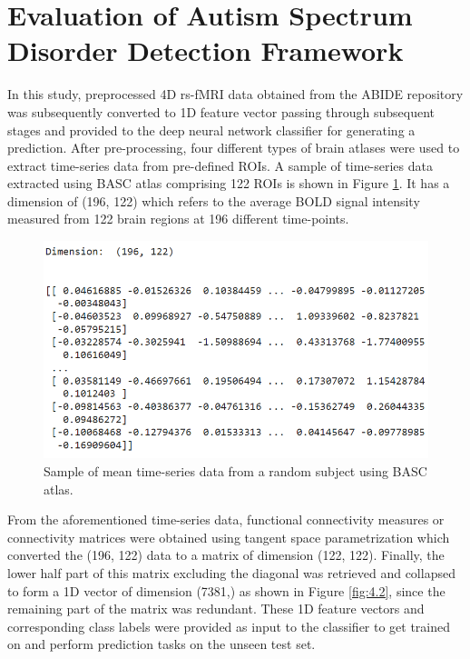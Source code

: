 \section{Evaluation of Autism Spectrum Disorder Detection Framework}

In this study, preprocessed 4D rs-fMRI data obtained from the ABIDE repository was subsequently converted to 1D feature vector passing through subsequent stages and provided to the deep neural network classifier for generating a prediction. After pre-processing, four different types of brain atlases
were used to extract time-series data from pre-defined ROIs. A sample of time-series data
extracted using BASC atlas comprising 122 ROIs is shown in Figure \ref{fig:4.1}. It has a dimension
of (196, 122) which refers to the average BOLD signal intensity measured from 122 brain
regions at 196 different time-points.

\begin{figure}[h]
\centering
\includegraphics[scale=0.5]{figures/Figure 4.1.png}
\caption{Sample of mean time-series data from a random subject using BASC atlas.}
\label{fig:4.1}
\end{figure}

From the aforementioned time-series data, functional connectivity measures or connectivity
matrices were obtained using tangent space parametrization which converted the (196, 122)
data to a matrix of dimension (122, 122). Finally, the lower half part of this matrix excluding
the diagonal was retrieved and collapsed to form a 1D vector of dimension (7381,) as shown
in Figure \ref{fig:4.2}, since the remaining part of the matrix was redundant. These 1D feature vectors
and corresponding class labels were provided as input to the classifier to get trained on and
perform prediction tasks on the unseen test set.


